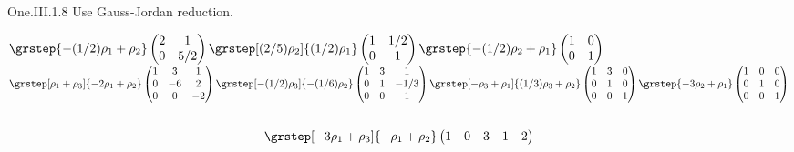\begin{ans}{One.III.1.8}
      Use Gauss-Jordan reduction.
      \begin{exparts}
        \partsitem $
            \grstep{-(1/2)\rho_1+\rho_2}
            \begin{pmatrix}
              2  &1  \\
              0  &5/2
            \end{pmatrix}
            \grstep[(2/5)\rho_2]{(1/2)\rho_1}
            \begin{pmatrix}
              1  &1/2\\
              0  &1
            \end{pmatrix}
            \grstep{-(1/2)\rho_2+\rho_1}
            \begin{pmatrix}
              1  &0  \\
              0  &1
            \end{pmatrix}$
        \partsitem $
            \grstep[\rho_1+\rho_3]{-2\rho_1+\rho_2}
            \begin{pmatrix}
              1  &3  &1  \\
              0  &-6 &2  \\
              0  &0  &-2
            \end{pmatrix}
            \grstep[-(1/2)\rho_3]{-(1/6)\rho_2}
            \begin{pmatrix}
              1  &3  &1     \\
              0  &1  &-1/3  \\
              0  &0  &1
            \end{pmatrix}
            \grstep[-\rho_3+\rho_1]{(1/3)\rho_3+\rho_2}
            \begin{pmatrix}
              1  &3  &0     \\
              0  &1  &0     \\
              0  &0  &1
            \end{pmatrix}
            \grstep{-3\rho_2+\rho_1}
            \begin{pmatrix}
              1  &0  &0     \\
              0  &1  &0     \\
              0  &0  &1
            \end{pmatrix}$
        \partsitem \ \begin{multline*}
            \grstep[-3\rho_1+\rho_3]{-\rho_1+\rho_2}
            \begin{pmatrix}
              1  &0  &3  &1  &2  \\

\end{pmatrix}
\end{multline*}
\end{exparts}
\end{ans}
